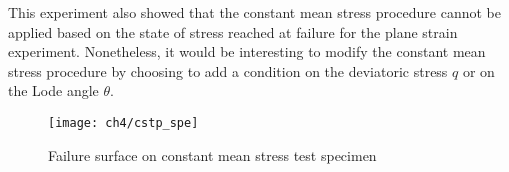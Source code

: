 This experiment also showed that the constant mean stress procedure cannot be applied based on the state of stress reached at failure for the plane strain experiment. Nonetheless, it would be interesting to modify the constant mean stress procedure by choosing to add a condition on the deviatoric stress $q$ or on the Lode angle $\theta$. 

\begin{figure}[tb]
    \centering
    \texttt{[image: ch4/cstp\_spe]}
    \caption{Failure surface on constant mean stress test specimen}
    \label{fig4:ctsp_spe}
\end{figure}